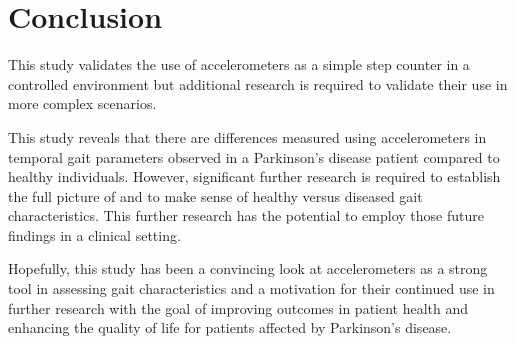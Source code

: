 
\section{Conclusion}
 This study validates the use of accelerometers as a simple step counter in a controlled environment but additional research is required to validate their use in more complex scenarios.
 
 This study reveals that there are differences measured using accelerometers in temporal gait parameters observed in a Parkinson's disease patient compared to healthy individuals. However, significant further research is required to establish the full picture of and to make sense of healthy versus diseased gait characteristics. This further research has the potential to employ those future findings in a clinical setting. 
 
 Hopefully, this study has been a convincing look at accelerometers as a strong tool in assessing gait characteristics and a motivation for their continued use in further research with the goal of improving outcomes in patient health and enhancing the quality of life for patients affected by Parkinson's disease.
 